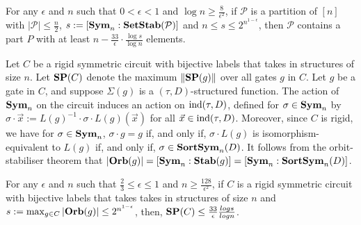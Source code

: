\documentclass[../paper.tex]{subfiles}
\begin{document}
\begin{lem}
  \label{lem:small-means-support}
  For any $\epsilon$ and $n$ such that $0 < \epsilon < 1$ and $\log n \geq
  \frac{8}{\epsilon^2}$, if $\mathcal{P}$ is a partition of $[n]$ with $\vert
  \mathcal{P} \vert \leq \frac{n}{2}$, $s:= [\text{\textbf{Sym}}_n : \text{\textbf{SetStab}} (\mathcal{P})]$
  and $n \leq s \leq 2^{n^{1-\epsilon}}$, then $\mathcal{P}$ contains a part $P$
  with at least $n - \frac{33}{\epsilon} \cdot \frac{\log s} {\log n}$
  elements.
\end{lem}

Let $C$ be a rigid symmetric circuit with bijective labels that takes in
structures of size $n$. Let $\text{\textbf{SP}}(C)$ denote the maximum $\| \text{\textbf{SP}}(g) \|$ over
all gates $g$ in $C$. Let $g$ be a gate in $C$, and suppose $\Sigma (g)$ is a
$(\tau, D)$-structured function. The action of $\text{\textbf{Sym}}_n$ on the circuit induces
an action on $\text{\upshape ind}(\tau,D)$, defined for $\sigma \in \text{\textbf{Sym}}_n$ by $\sigma \cdot \vec{x}
:= L(g)^{-1} \cdot \sigma \cdot L(g) (\vec{x})$ for all $\vec{x} \in \text{\upshape ind}(\tau,D)$.
Moreover, since $C$ is rigid, we have for $\sigma \in \text{\textbf{Sym}}_n$, $\sigma \cdot g =
g$ if, and only if, $\sigma \cdot L(g)$ is isomorphism-equivalent to $L(g)$ if,
and only if, $\sigma \in \text{\textbf{SortSym}}_n(D)$. It follows from the
orbit-stabiliser theorem that $\vert \text{\textbf{Orb}} (g) \vert = [\text{\textbf{Sym}}_n : \text{\textbf{Stab}}(g)] =
[\text{\textbf{Sym}}_n : \text{\textbf{SortSym}}_n(D)]$.

\begin{thm}
  \label{thm:support_thm}
  For any $\epsilon$ and $n$ such that $\frac{2}{3} \leq \epsilon \leq 1$ and $n
  \geq \frac{128}{\epsilon^2}$, if $C$ is a rigid symmetric circuit with
  bijective labels that takes takes in structures of size $n$ and $s := \max_{g
    \in C} \vert \text{\textbf{Orb}} (g)\vert \leq 2^{n^{1-\epsilon}}$, then, $\text{\textbf{SP}}(C) \leq
  \frac{33}{\epsilon}\frac{log s}{log n}$.
\end{thm}
\end{document}
